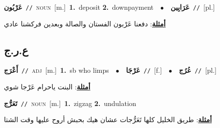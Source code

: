 \documentclass[10pt,a4paper,twoside]{article} %
\begin{document}
\begin{multicols}{2}
{\setlength\topsep{0pt}\textbf{\foreignlanguage{arabic}{عَرْبُون}}\ {\color{gray}\texttt{//}\color{black}}\ \textsc{noun}\ [m.]\ \textbf{1.}~deposit  \textbf{2.}~downpayment\ \ $\bullet$\ \ \setlength\topsep{0pt}\textbf{\foreignlanguage{arabic}{عَرَابِين}}\ {\color{gray}\texttt{//}\color{black}}\ [pl.]\  \begin{flushright}\color{gray}\foreignlanguage{arabic}{\textbf{\underline{\foreignlanguage{arabic}{أمثلة}}}: دفعنا عَرْبون الفستان والصالة وبعدين فركشنا عادي}\end{flushright}\color{black}} \vspace{2mm}

\vspace{-3mm}
\subsection*{\color{blue}\foreignlanguage{arabic}{ع.ر.ج}\color{blue}{}} 

{\setlength\topsep{0pt}\textbf{\foreignlanguage{arabic}{أَعْرَج}}\ {\color{gray}\texttt{//}\color{black}}\ \textsc{adj}\ [m.]\ \textbf{1.}~sb who limps\ \ $\bullet$\ \ \setlength\topsep{0pt}\textbf{\foreignlanguage{arabic}{عَرْجَا}}\ {\color{gray}\texttt{//}\color{black}}\ [f.]\ \ $\bullet$\ \ \setlength\topsep{0pt}\textbf{\foreignlanguage{arabic}{عُرُج}}\ {\color{gray}\texttt{//}\color{black}}\ [pl.]\  \begin{flushright}\color{gray}\foreignlanguage{arabic}{\textbf{\underline{\foreignlanguage{arabic}{أمثلة}}}: البنت ياحرام عَرْجا شوي}\end{flushright}\color{black}} \vspace{2mm}

{\setlength\topsep{0pt}\textbf{\foreignlanguage{arabic}{تَعَرُّج}}\ {\color{gray}\texttt{//}\color{black}}\ \textsc{noun}\ [m.]\ \textbf{1.}~zigzag  \textbf{2.}~undulation\  \begin{flushright}\color{gray}\foreignlanguage{arabic}{\textbf{\underline{\foreignlanguage{arabic}{أمثلة}}}: طريق الخليل كلها تَعَرُّجات عشان هيك بحبش أروح عليها وقت الشتا}\end{flushright}\color{black}} \vspace{2mm}


\end{multicols}
\end{document}
